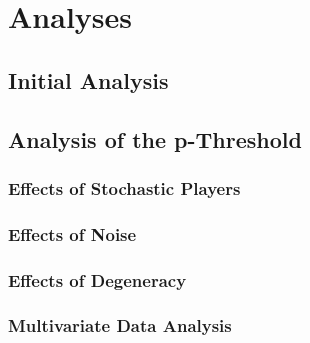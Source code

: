 \chapter{Analyses}

\section{Initial Analysis}

\section{Analysis of the p-Threshold}

\subsection{Effects of Stochastic Players}

\subsection{Effects of Noise}

\subsection{Effects of Degeneracy}

\subsection{Multivariate Data Analysis}